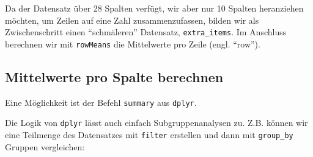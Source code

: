 \documentclass[12pt,ngerman,]{book}
\makeatletter
\newenvironment{Shaded}{\begin{snugshade}}{\end{snugshade}}
\newcommand{\KeywordTok}[1]{\textcolor[rgb]{0.13,0.29,0.53}{\textbf{{#1}}}}
\newcommand{\DataTypeTok}[1]{\textcolor[rgb]{0.13,0.29,0.53}{{#1}}}
\newcommand{\DecValTok}[1]{\textcolor[rgb]{0.00,0.00,0.81}{{#1}}}
\newcommand{\StringTok}[1]{\textcolor[rgb]{0.31,0.60,0.02}{{#1}}}
\newcommand{\CommentTok}[1]{\textcolor[rgb]{0.56,0.35,0.01}{\textit{{#1}}}}
\newcommand{\OtherTok}[1]{\textcolor[rgb]{0.56,0.35,0.01}{{#1}}}
\newcommand{\NormalTok}[1]{{#1}}
\newenvironment{kframe}{%
\medskip{}
\setlength{\fboxsep}{.8em}
 \def\at@end@of@kframe{}%
 \ifinner\ifhmode%
  \def\at@end@of@kframe{\end{minipage}}%
  \begin{minipage}{\columnwidth}%
 \fi\fi%
 \def\FrameCommand##1{\hskip\@totalleftmargin \hskip-\fboxsep
 \colorbox{shadecolor}{##1}\hskip-\fboxsep
     \hskip-\linewidth \hskip-\@totalleftmargin \hskip\columnwidth}%
 \MakeFramed {\advance\hsize-\width
   \@totalleftmargin\z@ \linewidth\hsize
   \@setminipage}}%
 {\par\unskip\endMakeFramed%
 \at@end@of@kframe}
\renewenvironment{Shaded}{\begin{kframe}}{\end{kframe}}
\theoremstyle{definition}
\theoremstyle{definition}
\theoremstyle{remark}
\makeatother
\begin{document}
Da der Datensatz über 28 Spalten verfügt, wir aber nur 10 Spalten
heranziehen möchten, um Zeilen auf eine Zahl zusammenzufassen, bilden
wir als Zwischenschritt einen ``schmäleren'' Datensatz,
\texttt{extra\_items}. Im Anschluss berechnen wir mit \texttt{rowMeans}
die Mittelwerte pro Zeile (engl. ``row'').

\subsection{Mittelwerte pro Spalte
berechnen}\label{mittelwerte-pro-spalte-berechnen}

Eine Möglichkeit ist der Befehl \texttt{summary} aus \texttt{dplyr}.

\begin{Shaded}
\end{Shaded}

Die Logik von \texttt{dplyr} lässt auch einfach Subgruppenanalysen zu.
Z.B. können wir eine Teilmenge des Datensatzes mit \texttt{filter}
erstellen und dann mit \texttt{group\_by} Gruppen vergleichen:

\begin{Shaded}
\end{Shaded}
\end{document}
